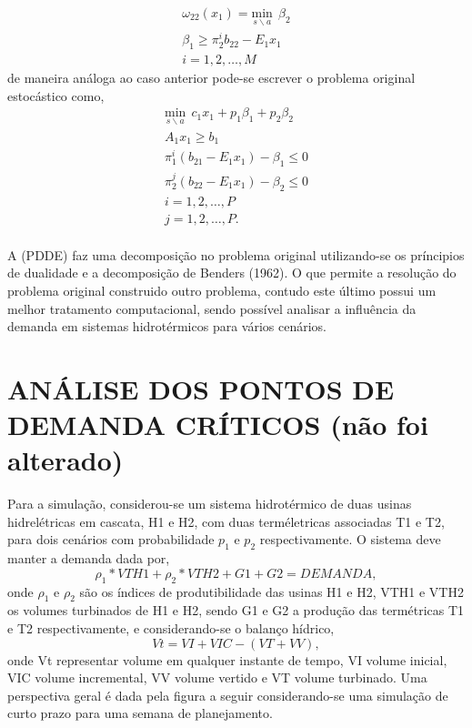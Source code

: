 \documentclass[12pt,fleqn]{article}
\begin{document}
\begin{equation*}
  \begin{aligned}
	{\omega}_{22}(x_1) = \underset {s \backslash a} {\text{min}} \ \ {\beta}_{2} \\
	{\beta}_{1}  \geq {\pi}_{2}^{i}b_{22} - E_1 x_1 \\
	i = 1,2,\dots, M 
  \end{aligned}
\end{equation*}
de maneira an\'aloga ao caso anterior pode-se escrever o problema original estoc\'astico como,
\begin{equation}
  \begin{aligned}
	\underset {s \backslash a} {\text{min}} \ \ c_1x_1 + p_1 {\beta}_{1} + p_2 {\beta}_{2} \\
	A_1 x_1 \geq b_1 \\
	{\pi}_{1}^{i}(b_{21} - E_1x_1) - {\beta}_{1} \leq 0 \\ 
	{\pi}_{2}^{j}(b_{22} - E_1x_1) - {\beta}_{2} \leq 0 \\ 
	i = 1, 2, \dots , P \\
	j = 1, 2, \dots , P. \\
  \end{aligned}
	\label{pd5}
\end{equation}

A (PDDE) faz uma decomposi\c c\~ao no problema original utilizando-se os pr\'incipios de dualidade e a decomposi\c c\~ao
de Benders (1962). O que permite a resolu\c c\~ao do problema original construido outro problema, contudo este
\'ultimo possui um melhor tratamento computacional, sendo poss\'ivel analisar a influ\^encia da demanda em sistemas hidrot\'ermicos para v\'arios cen\'arios.

\section{AN\'ALISE DOS PONTOS DE DEMANDA CR\'ITICOS (n\~ao foi alterado)}
Para a simula\c c\~ao, considerou-se um sistema hidrot\'ermico de duas usinas hidrel\'etricas em cascata,
H1 e H2, com duas term\'eletricas associadas T1 e T2, para dois cen\'arios com probabilidade $p_1$ e $p_2$
respectivamente.
O sistema deve manter a demanda dada por,
\begin{equation}
  {\rho}_1*VTH1 + {\rho}_2*VTH2 + G1 + G2 = DEMANDA,
\end{equation}
onde $\rho_1$ e $\rho_2$ s\~ao os \'indices de produtibilidade das usinas H1 e H2, VTH1 e VTH2  os volumes turbinados de
H1 e H2, sendo G1 e G2 a
produ\c c\~ao das term\'etricas T1 e T2 respectivamente, e considerando-se o balan\c co h\'idrico,
\begin{equation}
  Vt = VI + VIC - \left( VT + VV \right), 
\end{equation}
onde Vt representar volume em qualquer instante de tempo, VI volume inicial, VIC volume incremental, VV volume vertido e
VT volume turbinado. Uma perspectiva geral \'e dada pela figura a seguir considerando-se uma simula\c c\~ao de curto prazo para uma semana de planejamento.
\end{document}
